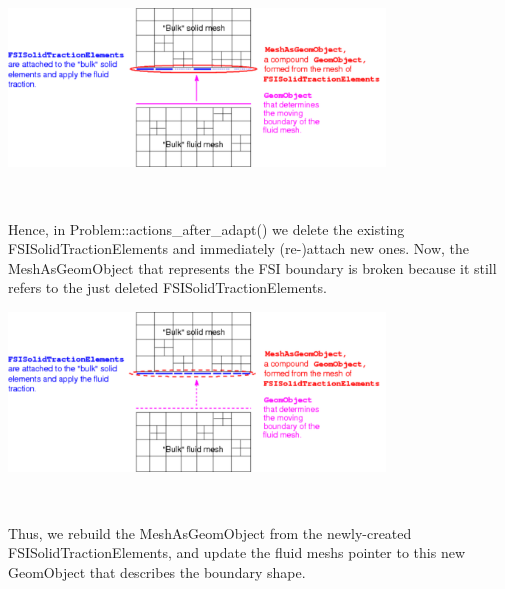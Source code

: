 \begin{DoxyEnumerate}
\begin{DoxyImage}
\includegraphics[width=0.75\textwidth]{fsi_with_adaptive_wall_adapted_solid}
\end{DoxyImage}
 ~\newline
~\newline

\item Hence, in {\ttfamily Problem\+::actions\+\_\+after\+\_\+adapt()} we delete the existing {\ttfamily F\+S\+I\+Solid\+Traction\+Elements} and immediately (re-\/)attach new ones. Now, the {\ttfamily Mesh\+As\+Geom\+Object} that represents the F\+SI boundary is broken because it still refers to the just deleted {\ttfamily F\+S\+I\+Solid\+Traction\+Elements}. ~\newline
~\newline
 
\begin{DoxyImage}
\includegraphics[width=0.75\textwidth]{fsi_with_adaptive_wall_new_face_elements}
\end{DoxyImage}
 ~\newline
~\newline

\item Thus, we rebuild the {\ttfamily Mesh\+As\+Geom\+Object} from the newly-\/created {\ttfamily F\+S\+I\+Solid\+Traction\+Elements}, and update the fluid mesh\textquotesingle{}s pointer to this new {\ttfamily Geom\+Object} that describes the boundary shape. ~\newline
~\newline
 

\end{DoxyEnumerate}
